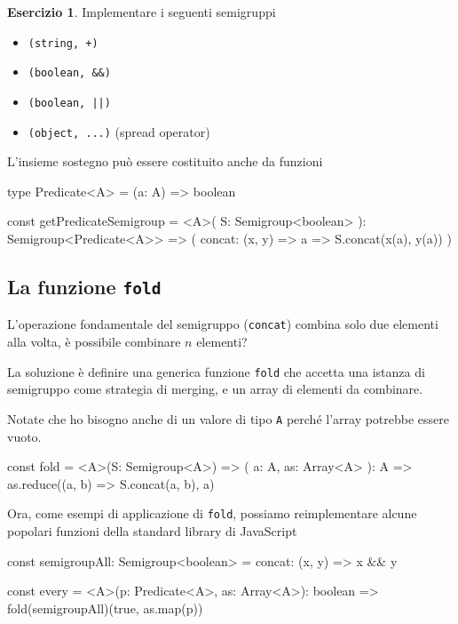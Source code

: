 \documentclass[12pt]{article}
\theoremstyle{definition}
\newtheorem{exercise}{Esercizio}[section]
\newenvironment{code}
  {\vspace{0.5cm} \VerbatimEnvironment\begin{typescriptcode}}
  {\end{typescriptcode} \vspace{0.2cm}}
\begin{document}
\begin{exercise}
Implementare i seguenti semigruppi
\begin{itemize}
  \item \texttt{(string, +)}
  \item \texttt{(boolean, \&\&)}
  \item \texttt{(boolean, ||)}
  \item \texttt{(object, ...)} (spread operator)
\end{itemize}
\end{exercise}

L'insieme sostegno può essere costituito anche da funzioni

\begin{code}
type Predicate<A> = (a: A) => boolean

const getPredicateSemigroup = <A>(
  S: Semigroup<boolean>
): Semigroup<Predicate<A>> => ({
  concat: (x, y) => a => S.concat(x(a), y(a))
})
\end{code}

\subsection{La funzione \texttt{fold}}

L'operazione fondamentale del semigruppo (\texttt{concat}) combina solo due elementi alla volta, è possibile combinare $n$ elementi?

La soluzione è definire una generica funzione \texttt{fold} che accetta una istanza di semigruppo come strategia di merging, e un array
di elementi da combinare.

Notate che ho bisogno anche di un valore di tipo \texttt{A} perché l'array potrebbe essere vuoto.

\begin{code}
const fold = <A>(S: Semigroup<A>) => (
  a: A,
  as: Array<A>
): A => as.reduce((a, b) => S.concat(a, b), a)
\end{code}

Ora, come esempi di applicazione di \texttt{fold}, possiamo reimplementare alcune popolari funzioni della standard library di JavaScript

\begin{code}
const semigroupAll: Semigroup<boolean> = {
  concat: (x, y) => x && y
}

const every = <A>(p: Predicate<A>, as: Array<A>): boolean =>
  fold(semigroupAll)(true, as.map(p))
\end{code}
\end{document}
